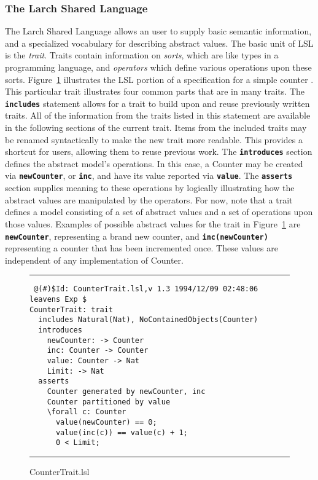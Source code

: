 \documentclass[12pt]{article} %
\newcommand{\reserved}[1]{\textbf{\texttt{#1}}} %
\newcommand{\UNSPACEFORBOX}{\vspace{-2ex}}
\newcommand{\HLINE}{\UNSPACEFORBOX%
\begin{flushleft}\rule{\textwidth}{0.01in}\end{flushleft}%
\UNSPACEFORBOX}
\newenvironment{BFIGURE}{

\begin{figure}
\small
\HLINE
}{
\HLINE
\normalsize
\end{figure}
}
\begin{document}
\subsubsection{The Larch Shared Language}
\label{lslintro}
The Larch Shared Language \cite{Guttag-Horning93} allows an user to
supply basic semantic information, and a specialized vocabulary for
describing abstract values. The basic unit of LSL is the
\emph{trait}. Traits contain information on \emph{sorts}, which are
like types in a programming language, and \emph{operators} which define
various operations upon these sorts. Figure~\ref{CounterTrait}
illustrates the LSL portion of a specification for a simple counter
\cite{Leavens96c}. This particular trait illustrates four common
parts that are in many traits. The
\reserved{includes} statement allows for a trait to build upon and
reuse previously written traits. All of the information from the
traits listed in this statement are available in the following
sections of the current trait. Items from the included traits may be
renamed syntactically to make the new trait more readable. This
provides a shortcut for users, allowing them to reuse previous work.
The \reserved{introduces} section defines the abstract model's
operations. In this case, a Counter may be created via
\reserved{newCounter}, or \reserved{inc}, and have its
value reported via \reserved{value}. The
\reserved{asserts} section supplies meaning to these
operations by logically illustrating how the abstract values are
manipulated by the operators. For now, note that a trait defines a
model consisting of a set of abstract values and a set of operations
upon those values. Examples of possible abstract values for the trait
in Figure~\ref{CounterTrait} are \reserved{newCounter}, representing a
brand new counter, and \reserved{inc(newCounter)} representing a
counter that has been incremented once. These values are independent
of any implementation of Counter.

\begin{BFIGURE}
\begin{verbatim}
 @(#)$Id: CounterTrait.lsl,v 1.3 1994/12/09 02:48:06 leavens Exp $
CounterTrait: trait
  includes Natural(Nat), NoContainedObjects(Counter)
  introduces
    newCounter: -> Counter
    inc: Counter -> Counter
    value: Counter -> Nat
    Limit: -> Nat
  asserts
    Counter generated by newCounter, inc
    Counter partitioned by value
    \forall c: Counter
      value(newCounter) == 0;
      value(inc(c)) == value(c) + 1;
      0 < Limit;
\end{verbatim}

\caption{CounterTrait.lsl}
\label{CounterTrait}
\end{BFIGURE}
\end{document}
